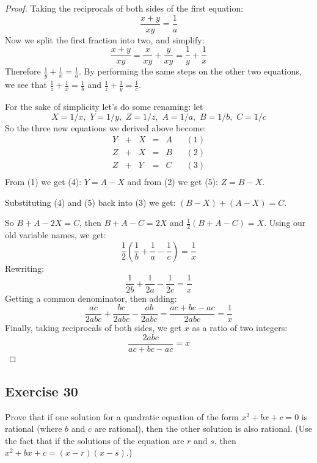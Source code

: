 \documentclass[14pt]{extarticle}
\newcommand{\dps}{\displaystyle}
\begin{document}
\begin{proof}
Taking the reciprocals of both sides of the first equation:
\[
\frac{x+y}{xy} = \frac{1}{a}
\]
Now we split the first fraction into two, and simplify:
\[
\frac{x+y}{xy} = \frac{x}{xy} + \frac{y}{xy} = \frac{1}{y} + \frac{1}{x}
\]
Therefore $\dps\frac{1}{y} + \frac{1}{x} = \frac{1}{a}$. By performing the same steps on the other two equations, we see that $\dps\frac{1}{z} + \frac{1}{x} = \frac{1}{b}$ and $\dps\frac{1}{z} + \frac{1}{y} = \frac{1}{c}$.

For the sake of simplicity let's do some renaming: let 
\[
X = 1/x, \,\, Y = 1/y, \,\, Z = 1/z, \,\, A = 1/a, \,\, B = 1/b, \,\, C = 1/c
\]
So the three new equations we derived above become:
\[
\begin{array}{ccccccc}
Y&+&X&=&A&&(1)\\
Z&+&X&=&B&&(2)\\
Z&+&Y&=&C&&(3)\\
\end{array}
\]
From (1) we get (4): $Y = A - X$ and from (2) we get (5): $Z = B - X$.

Substituting (4) and (5) back into (3) we get: $(B-X) + (A-X) = C$.

So $B+A-2X = C$, then $B+A-C = 2X$ and $\frac{1}{2}(B+A-C) = X$. Using our old variable names, we get:
\[
\frac{1}{2}\left(\frac{1}{b}+\frac{1}{a}-\frac{1}{c}\right) = \frac{1}{x}
\]
Rewriting:
\[
\frac{1}{2b}+\frac{1}{2a}-\frac{1}{2c} = \frac{1}{x}
\]
Getting a common denominator, then adding:
\[
\frac{ac}{2abc}+\frac{bc}{2abc}-\frac{ab}{2abc} = \frac{ac + bc - ac}{2abc} = \frac{1}{x}
\]
Finally, taking reciprocals of both sides, we get $x$ as a ratio of two integers:
\[
\frac{2abc}{ac + bc - ac} = x
\]
\end{proof}

\subsection{Exercise 30}
Prove that if one solution for a quadratic equation of the form $x^2 + bx + c = 0$ is rational (where $b$ and $c$ are rational), then the other solution is also rational. (Use the fact that if the solutions of the equation are $r$ and $s$, then $x^2 + bx + c = (x - r)(x - s)$.)
\end{document}
